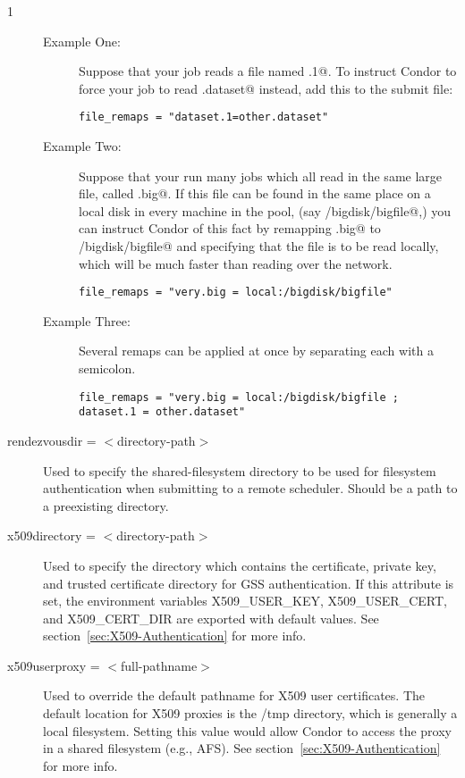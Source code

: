 \begin{ManPage}{\label{man-condor-submit}}{1}
\begin{description}
\begin{description}
\item[Example One:]
Suppose that your job reads a file named \verb@dataset.1@.  To instruct Condor
to force your job to read \verb@other.dataset@ instead, 
add this to the submit file:
\begin{verbatim}
file_remaps = "dataset.1=other.dataset"
\end{verbatim}
\item[Example Two:]
Suppose that your run many jobs which all read in the same large file,
called \verb@very.big@.  If this file can be found in the same place on
a local disk in every machine in the pool,
(say \verb@/bigdisk/bigfile@,) you can
instruct Condor of this fact by remapping \verb@very.big@ to
\verb@/bigdisk/bigfile@ and specifying that the file is to be read locally,
which will be much faster than reading over the network.
\begin{verbatim}
file_remaps = "very.big = local:/bigdisk/bigfile"
\end{verbatim}
\item[Example Three:]
Several remaps can be applied at once by separating each with a semicolon.
\begin{verbatim}
file_remaps = "very.big = local:/bigdisk/bigfile ; dataset.1 = other.dataset"
\end{verbatim}
\end{description}


\item[rendezvousdir = $<$directory-path$>$] Used to specify the 
shared-filesystem directory to be used for filesystem authentication
when submitting to a remote scheduler.  Should be a path to a preexisting 
directory.  


\item[x509directory = $<$directory-path$>$] Used to specify the directory 
which contains the certificate, private key, and trusted certificate directory
for GSS authentication. If this attribute is set, the environment variables 
X509\_USER\_KEY, X509\_USER\_CERT, and X509\_CERT\_DIR are exported with 
default values. See section~\ref{sec:X509-Authentication} for more info.


\item[x509userproxy = $<$full-pathname$>$] Used to override the default
pathname for X509 user certificates. The default location for X509 proxies
is the /tmp directory, which is generally a local filesystem. Setting
this value would allow Condor to access the proxy in a shared filesystem
(e.g., AFS).  See section~\ref{sec:X509-Authentication} for more info.


\end{description}
\end{ManPage}
